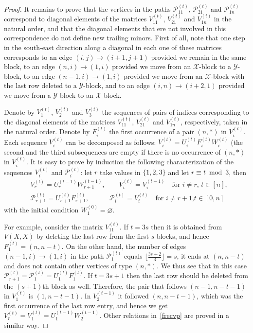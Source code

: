 \documentclass{amsart}
\theoremstyle{definition}
\theoremstyle{remark}
\numberwithin{equation}{section}
\numberwithin{theorem}{section}
\begin{document}
\begin{proof}
It remains to prove that the vertices in the paths  ${{\mathcal P}}_{11}^{(t)}$, 
${{\mathcal P}}_{21}^{(t)}$ and ${{\mathcal P}}_{1n}^{(t)}$ correspond to diagonal elements of the matrices $V^{(t)}_{11}$, 
$V^{(t)}_{21}$ and $V^{(t)}_{1n}$ in the natural order,
and that the diagonal elements that ere not involved in this correspondence do not define new trailing
minors. First of all, note that one step in the south-east direction
along a diagonal in each one of these matrices corresponds to an edge $(i,j)\to (i+1,j+1)$ provided we remain in the same block, to an edge $(n,i)\to(1,i)$ provided we move from an ${{\mathcal X}}$-block to a ${{\mathcal Y}}$-block, to an edge
$(n-1,i)\to (1,i)$ provided we move from an ${{\mathcal X}}$-block with the last row deleted to a ${{\mathcal Y}}$-block, and to
an edge $(i,n)\to (i+2,1)$ provided we move from a ${{\mathcal Y}}$-block to an ${{\mathcal X}}$-block.

Denote by $V_1^{(t)}$, $V_2^{(t)}$ and $V_3^{(t)}$ the sequences of pairs of indices corresponding to the
diagonal elements of the matrices $V^{(t)}_{11}$, 
$V^{(t)}_{21}$ and $V^{(t)}_{1n}$, respectively, taken in the natural order. 
Denote by $F^{(t)}_i$ the first occurrence of 
a pair $(n,*)$ in $V^{(t)}_i$. 
Each sequence
$V_i^{(t)}$ can be decomposed as follows: $V^{(t)}_i=U_i^{(t)}F^{(t)}_iW^{(t)}_i$ (the second and the third 
subsequences are empty if there is no occurrence of $(n,*)$ in $V^{(t)}_i$. It is easy to prove by
induction the following characterization of the sequences $V^{(t)}_i$ and ${{\mathcal P}}^{(t)}_i$:
let $r$ take values in $\{1,2,3\}$ and let $r\equiv t\bmod 3$,  then
\begin{equation}\label{frecvp}
\begin{aligned}
&V^{(t)}_r= U^{(t-1)}_rW^{(t-1)}_{r+1},\qquad V^{(t)}_i= V^{(t-1)}_i\quad \text{for $i\ne r$, $t\in [n]$},\\
&{{\mathcal P}}^{(t)}_{r+1}= U^{(t)}_{r+1}F^{(t)}_{r+1},\qquad\quad {{\mathcal P}}^{(t)}_i= V^{(t)}_i\quad \text{for $i\ne r+1$,
$t\in [0,n]$}
\end{aligned}
\end{equation}
with the initial condition $W^{(0)}_{1}=\varnothing$.

For example, 
consider the matrix $V^{(t)}_{11}$. If $t=3s$ then it is obtained from $V(X,X)$ by deleting the last
row from the first $s$ blocks, and hence $F_{1}^{(t)}=(n,n-t)$. 
On the other hand, the number of edges $(n-1,i)\to (1,i)$ in the path
${{\mathcal P}}_{1}^{(t)}$ equals $\lfloor \frac{3s+2}3\rfloor=s$, it ends at $(n,n-t)$ and does not
contain other vertices of type $(n,*)$. We thus see that in this case ${{\mathcal P}}_{r+1}^{(t)}={{\mathcal P}}_1^{(t)}=
U_1^{(t)}F_1^{(t)}$. If $t=3s+1$ then the last row should be deleted from the $(s+1)$th block as well.
Therefore, the pair that follows $(n-1,n-t-1)$ in $V_1^{(t)}$ is $(1,n-t-1)$. In $V_2^{(t-1)}$
it followed $(n,n-t-1)$, which was the first occurrence of the last row entry, and hence
we get $V_r^{(t)}=V_1^{(t)}=U_1^{(t-1)}W_2^{(t-1)}$. Other relations in~\eqref{frecvp} are proved in a similar way.


\end{proof}
\end{document}
